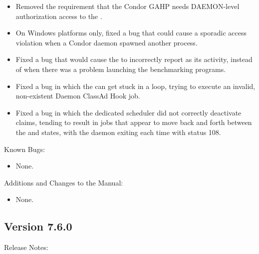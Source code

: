 \begin{itemize}
\item Removed the requirement that the Condor GAHP needs DAEMON-level 
authorization access to the . 

\item On Windows platforms only, 
fixed a bug that could cause a sporadic access violation 
when a Condor daemon spawned another process.

\item Fixed a bug that would cause the  to 
incorrectly report  as its activity, instead of 
when there was a problem launching the benchmarking programs. 

\item Fixed a bug in which the  can get stuck in a loop,
trying to execute an invalid, non-existent Daemon ClassAd Hook job. 

\item Fixed a bug in which the dedicated scheduler did not correctly 
deactivate claims,
tending to result in jobs that appear to move back and forth between
the  and  states,
with the  daemon exiting each time with status 108.

\end{itemize}

\noindent Known Bugs:

\begin{itemize}

\item None.

\end{itemize}

\noindent Additions and Changes to the Manual:

\begin{itemize}

\item None.

\end{itemize}


\subsection*{\label{sec:New-7-6-0}Version 7.6.0}

\noindent Release Notes:

